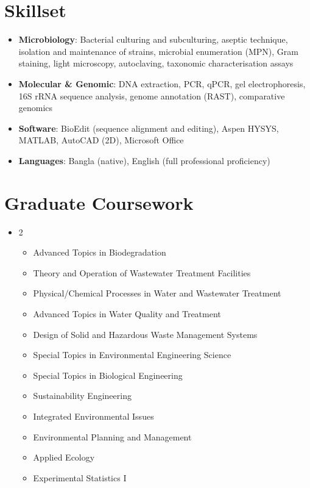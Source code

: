 \documentclass[letterpaper,20pt]{article}
\newcommand{\resumeItem}[2]{
  \item\small{
    \textbf{#1}{: #2 \vspace{-2pt}}
  }
}
\newcommand{\resumeSubHeadingListStart}{\begin{itemize}[leftmargin=*]}
\newcommand{\resumeSubHeadingListEnd}{\end{itemize}}
\newcommand{\resumeItemListStart}{\begin{itemize}}
\newcommand{\resumeItemListEnd}{\end{itemize}\vspace{-5pt}}
\begin{document}
\section{Skillset}
  \resumeSubHeadingListStart
    \resumeItemListStart
      \resumeItem{Microbiology}{Bacterial culturing and subculturing, aseptic technique, isolation and maintenance of strains, microbial enumeration (MPN), Gram staining, light microscopy, autoclaving, taxonomic characterisation assays}
      \resumeItem{Molecular \& Genomic}{DNA extraction, PCR, qPCR, gel electrophoresis, 16S rRNA sequence analysis, genome annotation (RAST), comparative genomics}
      \resumeItem{Software}{BioEdit (sequence alignment and editing), Aspen HYSYS, MATLAB, AutoCAD (2D), Microsoft Office}
      \resumeItem{Languages}{Bangla (native), English (full professional proficiency)}
    \resumeItemListEnd
  \resumeSubHeadingListEnd
\vspace{-6pt}

\section{Graduate Coursework}
  \resumeSubHeadingListStart
    \item[]
    \begin{multicols}{2}
      \begin{itemize}[leftmargin=*, itemsep=1pt, topsep=0pt]
        \small
        \item Advanced Topics in Biodegradation
        \item Theory and Operation of Wastewater Treatment Facilities
        \item Physical/Chemical Processes in Water and Wastewater Treatment
        \item Advanced Topics in Water Quality and Treatment
        \item Design of Solid and Hazardous Waste Management Systems
        \item Special Topics in Environmental Engineering Science
        \item Special Topics in Biological Engineering
        \item Sustainability Engineering
        \item Integrated Environmental Issues
        \item Environmental Planning and Management
        \item Applied Ecology
        \item Experimental Statistics I
      \end{itemize}
    \end{multicols}
    \vspace{-8pt}
  \resumeSubHeadingListEnd
\end{document}

